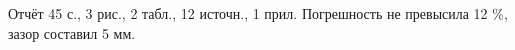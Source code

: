 Отчёт 45 с., 3 рис., 2 табл., 12 источн., 1 прил. %
Погрешность не превысила 12 \%, зазор составил 5 мм. %
